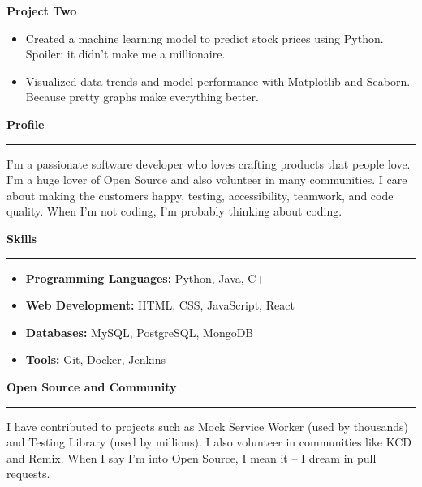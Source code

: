 \documentclass[a4paper,11pt]{article}
\newcommand{\sectiontitle}[1]{\textbf{\Large #1}\par\vspace{-1em}\noindent\rule{\linewidth}{0.3mm}\par\vspace{0.3em}}
\begin{document}
\begin{multicols}{2}
	\textbf{\large Project Two}
	\begin{itemize}
		\item Created a machine learning model to predict stock prices using Python. Spoiler: it didn’t make me a millionaire.
		\item Visualized data trends and model performance with Matplotlib and Seaborn. Because pretty graphs make everything better.
	\end{itemize}

	\vfill\null
	\columnbreak

	\sectiontitle{Profile}
	I'm a passionate software developer who loves crafting products that people love. I'm a huge lover of Open Source and also volunteer in many communities. I care about making the customers happy, testing, accessibility, teamwork, and code quality. When I'm not coding, I'm probably thinking about coding.

	\vspace{1em}

	\sectiontitle{Skills}
	\begin{itemize}
		\item \textbf{Programming Languages:} Python, Java, C++
		\item \textbf{Web Development:} HTML, CSS, JavaScript, React
		\item \textbf{Databases:} MySQL, PostgreSQL, MongoDB
		\item \textbf{Tools:} Git, Docker, Jenkins
	\end{itemize}

	\vspace{1em}

	\sectiontitle{Open Source and Community}
	I have contributed to projects such as Mock Service Worker (used by thousands) and Testing Library (used by millions). I also volunteer in communities like KCD and Remix. When I say I’m into Open Source, I mean it – I dream in pull requests.

\end{multicols}
\end{document}
